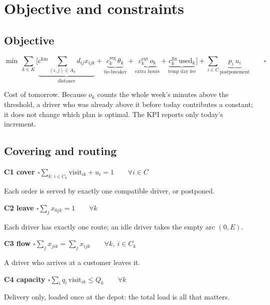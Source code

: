 \documentclass[11pt,a4paper]{article}
\newcommand{\ok}{$\square$}
\newcommand{\cons}[2]{\par\smallskip\noindent\textbf{\color{accent}#1}\quad #2\par}
\newcommand{\visit}{\mathrm{visit}}\newcommand{\used}{\mathrm{used}}
\begin{document}
\section{Objective and constraints}

\subsection{Objective}

\[
\min\ \sum_{k\in K}\Big[\underbrace{c^{\mathrm{km}}\!\!\sum_{(i,j)\in A_k}\!\! d_{ij}x_{ijk}}_{\text{distance}}
+ \underbrace{c^{\mathrm{reg}}_k\,\theta_k}_{\text{tie-breaker}}
+ \underbrace{c^{\mathrm{ext}}_k\,o_k}_{\text{extra hours}}
+ \underbrace{c^{\mathrm{fix}}_k\,\used_k}_{\text{temp day fee}}\Big]
+ \sum_{i\in C}\underbrace{p_i\,u_i}_{\text{postponement}}
\qquad \text{\ok}
\]
\begin{words}
Cost of tomorrow. Because $o_k$ counts the whole week's minutes above the threshold, a driver who was already above it before today contributes a constant; it does not change which plan is optimal. The KPI reports only today's increment.
\end{words}

\subsection{Covering and routing}

\cons{C1 cover \ok}{$\displaystyle\sum_{k:\,i\in C_k}\visit_{ik} + u_i = 1 \qquad \forall i\in C$}
\begin{words}Each order is served by exactly one compatible driver, or postponed.\end{words}

\cons{C2 leave \ok}{$\displaystyle\sum_{j}x_{0jk} = 1 \qquad \forall k$}
\begin{words}Each driver has exactly one route; an idle driver takes the empty arc $(0,E)$.\end{words}

\cons{C3 flow \ok}{$\displaystyle\sum_{j}x_{jik} = \sum_{j}x_{ijk} \qquad \forall k,\ i\in C_k$}
\begin{words}A driver who arrives at a customer leaves it.\end{words}

\cons{C4 capacity \ok}{$\displaystyle\sum_{i}q_i\,\visit_{ik} \le Q_k \qquad \forall k$}
\begin{words}Delivery only, loaded once at the depot: the total load is all that matters.\end{words}
\end{document}
